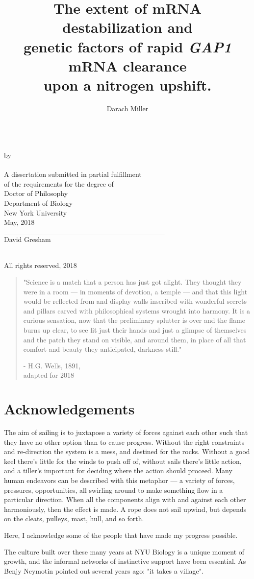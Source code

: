 \documentclass[12pt,letterpaper]{memoir}
\title{
The extent of mRNA destabilization and 
\\genetic factors of rapid \textit{GAP1} mRNA clearance 
\\upon a nitrogen upshift.
}
\author{Darach Miller}
\makeatletter
\def\makemytitle{
  \newpage
\begin{center}
\vfill
  \@title\\
\vfill
  by\\
\vfill
  \@author\\
\vfill
  A dissertation submitted in partial fulfillment \\
  of the requirements for the degree of \\
  Doctor of Philosophy \\
  Department of Biology \\
  New York University \\
\vfill
  \monthz, \yearz\\
  \end{center}
\vfill
\begin{flushright}
  $\rule{3.25in}{0.01mm}$\\
  David Gresham
\end{flushright}
  \pagebreak
\begin{center}
  \textcopyright \hspace{0.2em} \@author \\
  All rights reserved, \yearz \\
\end{center}
  \pagebreak
}
\def\monthz{May}
\def\yearz{2018}
\makeatother
\begin{document}
\DoubleSpacing
\frontmatter
\pagestyle{empty}

\makemytitle

\iftrue
\begin{quote}
\SingleSpace
"Science is a match that a person has just got alight. 
They thought they were in a room --- 
in moments of devotion, a temple --- 
and that this light would be reflected from and display walls 
inscribed with wonderful secrets and pillars carved with 
philosophical systems wrought into harmony. 
\vfill
It is a curious sensation, now that the preliminary splutter is 
over and the flame burns up clear, to see lit just their hands and 
just a glimpse of themselves and the patch they stand on visible, and 
around them, in place of all that comfort and beauty they
anticipated, \vspace{0.5em} darkness still."

\hfill - H.G. Wells, 1891, \\\vspace{1em}\hfill adapted for 2018
\end{quote}
\fi

\newpage

\section*{Acknowledgements}

\label{section:acknow}

\iffalse

The aim of sailing is to juxtapose a variety of forces against 
each other such that they have no other option than to cause progress.
Without the right constraints and re-direction the system is a 
mess, and destined for the rocks.
Without a good keel there's little for the winds to push off of,
without sails there's little action, and a tiller's important for
deciding where the action should proceed.
Many human endeavors can be described with 
this metaphor --- a variety of forces, pressures, opportunities, 
all swirling around to make something flow in a particular
direction. When all the components align with and against each
other harmoniously, then the effect is made. 
A rope does not sail upwind, but depends on the cleats, pulleys,
mast, hull, and so forth.
 
Here, I acknowledge some of the people that have 
made my progress possible.

The culture built over these many years at NYU Biology is a unique 
moment of growth, and the informal networks of instinctive support
have been essential.
As Benjy Neymotin pointed out several years ago: "it takes a village".
\end{document}

